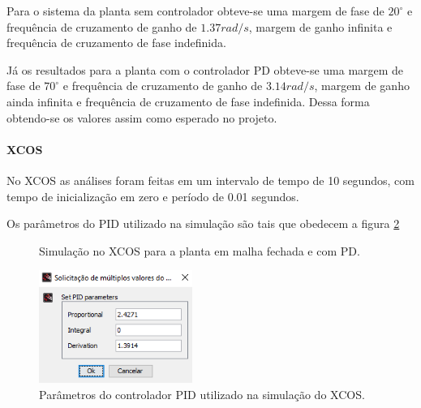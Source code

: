 Para o sistema da planta sem controlador obteve-se uma margem de fase de $20^{\circ}$ e frequência de cruzamento de ganho de $1.37 rad/s$, margem de ganho infinita e frequência de cruzamento de fase indefinida.

Já os resultados para a planta com o controlador PD obteve-se uma margem de fase de $70^{\circ}$ e frequência de cruzamento de ganho de $3.14 rad/s$, margem de ganho ainda infinita e frequência de cruzamento de fase indefinida. Dessa forma obtendo-se os valores assim como esperado no projeto.


\paragraph{XCOS}

No XCOS as análises foram feitas em um intervalo de tempo de 10 segundos, com tempo de inicialização em zero e período de 0.01 segundos.

Os parâmetros do PID utilizado na simulação são tais que obedecem a figura \ref{xcos:pid}

\begin{figure}[H]
\begin{center}
\end{center}
\caption{Simulação no XCOS para a planta em malha fechada e com PD.}
\label{xcos:clpd} 
\end{figure}

\begin{figure}[H]
\begin{center}
    \includegraphics[width=5cm]{images/metodo_frequencial/pid.png}  
\end{center}
\caption{Parâmetros do controlador PID utilizado na simulação do XCOS.}
\label{xcos:pid} 
\end{figure}

